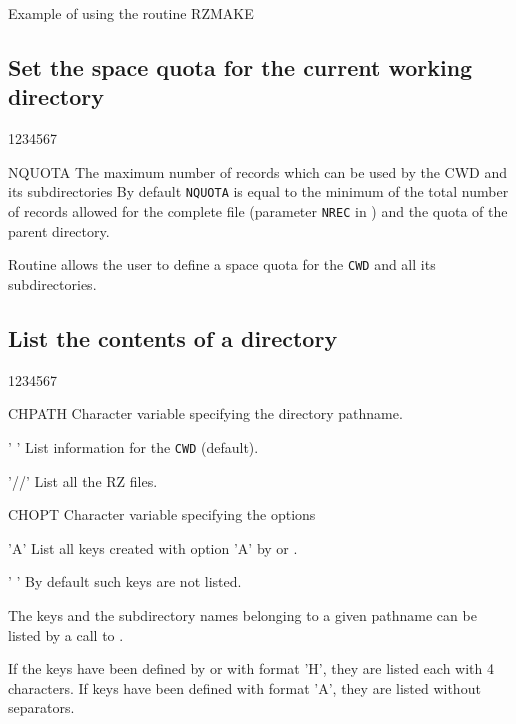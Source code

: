 \begin{XMPt}{Example of using the routine RZMAKE}
\subsection{Set the space quota for the current working directory}
\Idesc
\begin{DLtt}{1234567}
\item[NQUOTA]The maximum number of records which can be used by the CWD and its
subdirectories
\newline By default {\tt NQUOTA} is equal to the minimum of the total number of
records allowed for the complete file (parameter {\tt NREC}
in ) and the quota of the parent directory.
\end{DLtt}
\par 
Routine  allows the user to define a
space quota for the {\tt CWD} and all its subdirectories.
\subsection{List the contents of a directory}
\Idesc
\begin{DLtt}{1234567}
\item[CHPATH]Character variable specifying the directory pathname.
\begin{DLtt}{12}
\item[' ']List information for the {\tt CWD} (default).
\item['//']List all the RZ files.
\end{DLtt}
\item[CHOPT]Character variable specifying the options
\begin{DLtt}{12}
\item['A']List all keys created with option 'A' by 
or .
\item[' ']By default such keys are not listed.
\end{DLtt}
\end{DLtt}
\par 
The keys and the subdirectory names belonging to a given pathname can
be listed by a call to .
\par 
If the keys have been defined by  or 
with format 'H',
they are listed each with 4 characters. If keys have been defined
with format 'A', they are listed without separators.

\end{XMPt}
